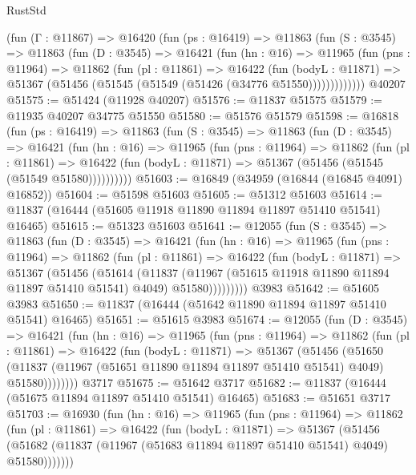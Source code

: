 \begin{lexlean}{RustStd}
\begin{coremodule}
    (fun (Γ : @11867) =>
    @16420
      (fun (ps : @16419) =>
      @11863
        (fun (S : @3545) =>
        @11863
          (fun (D : @3545) =>
          @16421
            (fun (hn : @16) =>
            @11965
              (fun (pns : @11964) =>
              @11862
                (fun (pl : @11861) =>
                @16422
                  (fun (bodyL : @11871) =>
                  @51367 (@51456 (@51545 (@51549 (@51426 (@34776 @51550)))))))))))))
    @40207
@51575 := @51424 (@11928 @40207)
@51576 := @11837 @51575
@51579 := @11935 @40207 @34775 @51550
@51580 := @51576 @51579
@51598 := @16818
    (fun (ps : @16419) =>
    @11863
      (fun (S : @3545) =>
      @11863
        (fun (D : @3545) =>
        @16421
          (fun (hn : @16) =>
          @11965
            (fun (pns : @11964) =>
            @11862
              (fun (pl : @11861) =>
              @16422 (fun (bodyL : @11871) => @51367 (@51456 (@51545 (@51549 @51580))))))))))
@51603 := @16849 (@34959 (@16844 (@16845 @4091) @16852))
@51604 := @51598 @51603
@51605 := @51312 @51603
@51614 := @11837 (@16444 (@51605 @11918 @11890 @11894 @11897 @51410 @51541) @16465)
@51615 := @51323 @51603
@51641 := @12055
    (fun (S : @3545) =>
    @11863
      (fun (D : @3545) =>
      @16421
        (fun (hn : @16) =>
        @11965
          (fun (pns : @11964) =>
          @11862
            (fun (pl : @11861) =>
            @16422
              (fun (bodyL : @11871) =>
              @51367
                (@51456
                  (@51614
                    (@11837
                      (@11967 (@51615 @11918 @11890 @11894 @11897 @51410 @51541) @4049)
                      @51580)))))))))
    @3983
@51642 := @51605 @3983
@51650 := @11837 (@16444 (@51642 @11890 @11894 @11897 @51410 @51541) @16465)
@51651 := @51615 @3983
@51674 := @12055
    (fun (D : @3545) =>
    @16421
      (fun (hn : @16) =>
      @11965
        (fun (pns : @11964) =>
        @11862
          (fun (pl : @11861) =>
          @16422
            (fun (bodyL : @11871) =>
            @51367
              (@51456
                (@51650
                  (@11837 (@11967 (@51651 @11890 @11894 @11897 @51410 @51541) @4049) @51580))))))))
    @3717
@51675 := @51642 @3717
@51682 := @11837 (@16444 (@51675 @11894 @11897 @51410 @51541) @16465)
@51683 := @51651 @3717
@51703 := @16930
    (fun (hn : @16) =>
    @11965
      (fun (pns : @11964) =>
      @11862
        (fun (pl : @11861) =>
        @16422
          (fun (bodyL : @11871) =>
          @51367
            (@51456
              (@51682 (@11837 (@11967 (@51683 @11894 @11897 @51410 @51541) @4049) @51580)))))))

\end{coremodule}
\end{lexlean}

